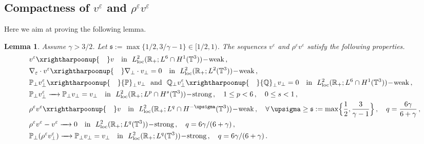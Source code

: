 \documentclass[11pt,reqno]{amsart}
\newtheorem{lemma}{Lemma}
\def \R{{\mathbb{R}}}
\def \Q{{\mathbb{Q}}}
\def \T{{\mathbb{T}}}
\def \P{{\mathbb{P}}}
\begin{document}

\subsection{Compactness of $v^\varepsilon $ and $\rho^\varepsilon v^\varepsilon $}
Here we aim at proving the following lemma.
\begin{lemma}
  \label{lem:cv-vperp} Assume $\gamma > 3/2$.
  Let $\mathfrak s := \max\{1/2, 3/\gamma-1\} \in [1/2,1)$. The sequences $v^\varepsilon$ and $\rho^\varepsilon v^\varepsilon $ satisfy the following properties.
    \begin{align*}
      & v^\varepsilon \xrightharpoonup{\quad} v \ \ \mbox{ \rm in } \  L_{\rm loc}^2(\R_+; L^6\cap H^1(\T^3))\!-\!\mbox{\rm weak}\,,\\
      & \nabla_\varepsilon \cdot v^\varepsilon   \xrightharpoonup{\quad}\nabla_\perp \cdot v_\perp =0 \ \ \mbox{ \rm in } \  L_{\rm loc}^2(\R_+; L^2(\T^3))\!-\!\mbox{\rm weak}\,,\\
      & \P_\perp v_\perp^\varepsilon \xrightharpoonup{\quad} \P_\perp v_\perp \ \mbox{ \textrm{and} } \ \Q_\perp v_\perp^\varepsilon \xrightharpoonup{\quad} \Q_\perp v_\perp = 0 \ \ \mbox{ \rm in } \  L_{\rm loc}^2(\R_+; L^6\cap H^{1}(\T^3))\!-\!\mbox{\rm weak}\,, \\
      & \P_\perp v_\perp^\varepsilon \xrightarrow{\quad} \P_\perp v_\perp=  v_\perp \ \ \mbox{ \rm in } \  L_{\rm loc}^2(\R_+; L^p\cap H^{s}(\T^3))\!-\!\mbox{\rm strong}\,, \quad 1\leq p <6\,, \quad 0\leq s <1\,, \\
      & \rho^\varepsilon v^\varepsilon  \xrightharpoonup {\quad} v
      \ \ \mbox{ \rm in } \  L_{\rm loc}^2(\R_+; L^q\cap H^{-\upsigma}(\T^3))\!-\!\mbox{\rm weak}\,, \quad \forall\, \upsigma \geq \mathfrak s := \max\Bigl\{\frac{1}{2},\frac{3}{\gamma-1} \Bigr\}\,, \quad  q=\frac{6\gamma}{6+\gamma} \,,\\
      & \rho^\varepsilon v^\varepsilon-v^\varepsilon  \xrightarrow{\quad} 0
      \ \ \mbox{ \rm in } \  L_{\rm loc}^2(\R_+; L^q(\T^3))\!-\!\mbox{\rm strong}\,, \quad   q={6\gamma}/({6+\gamma})\,, \\
      & \P_\perp (\rho^\varepsilon v_\perp^\varepsilon)  \xrightarrow{\quad} \P_\perp v_\perp=  v_\perp
      \ \ \mbox{ \rm in } \  L_{\rm loc}^2(\R_+; L^q(\T^3))\!-\!\mbox{\rm strong}\,, \quad   q={6\gamma}/({6+\gamma})\,.
    \end{align*}
\end{lemma}
\end{document}
